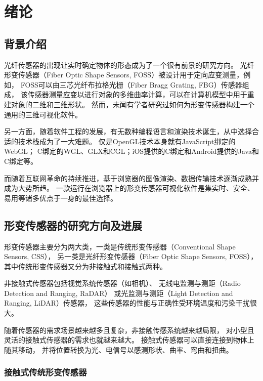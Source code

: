 \clearpage

\section{绪论}

\subsection{背景介绍}

光纤传感器的出现让实时确定物体的形态成为了一个很有前景的研究方向\cite{recent-dev-in-foss}。
光纤形变传感器（Fiber Optic Shape Sensors, FOSS）被设计用于定向应变测量，例如，
FOSS可以由三芯光纤布拉格光栅（Fiber Bragg Grating, FBG）传感器组成，
该传感器测量应变以进行对象的多维曲率计算，可以在计算机模型中用于重建对象的二维和三维形状。
然而，未闻有学者研究过如何为形变传感器构建一个通用的三维可视化软件。

另一方面，随着软件工程的发展，有无数种编程语言和渲染技术诞生，从中选择合适的技术栈成为了一大难题。
仅是OpenGL\cite{opengl}技术本身就有JavaScript绑定的WebGL\cite{webgl}；
C绑定的WGL、GLX和CGL；iOS提供的C绑定和Android提供的Java和C绑定等。

而随着互联网革命的持续推进，基于浏览器的图像渲染、数据传输技术逐渐成熟并成为大势所趋。
一款运行在浏览器上的形变传感器可视化软件是集实时、安全、易用等诸多优点于一身的最佳选择。

\subsection{形变传感器的研究方向及进展}

形变传感器主要分为两大类，一类是传统形变传感器（Conventional Shape Sensors, CSS），
另一类是光纤形变传感器（Fiber Optic Shape Sensors, FOSS）， 
其中传统形变传感器又分为非接触式和接触式两种。

非接触式传感器包括视觉系统传感器（如相机）、
无线电监测与测距（Radio Detection and Ranging, RaDAR）
或光监测与测距（Light Detection and Ranging, LiDAR）传感器，
这些传感器的性能与正确性受环境温度和污染干扰很大。

随着传感器的需求场景越来越多且复杂，非接触传感系统越来越局限，
对小型且灵活的接触式传感器的需求也就越来越大。
接触式传感器可以直接连接到物体上随其移动，
并将位置转换为光、电信号以感测形状、曲率、弯曲和扭曲。

\subsubsection{接触式传统形变传感器}

